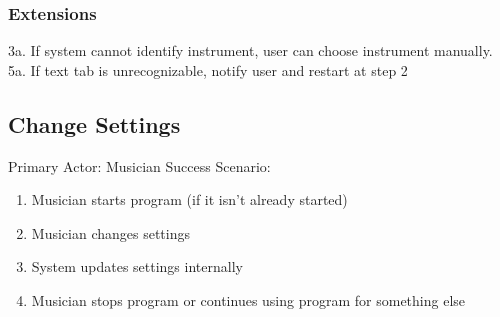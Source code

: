 \documentclass[11pt]{article}
\begin{document}
\subsubsection{Extensions}
\label{sec:orga29f8ba}
3a. If system cannot identify instrument, user can choose instrument manually.
5a. If text tab is unrecognizable, notify user and restart at step 2

\subsection{Change Settings}
\label{sec:orga3d6cb7}
Primary Actor: Musician
Success Scenario:
\begin{enumerate}
\item Musician starts program (if it isn't already started)
\item Musician changes settings
\item System updates settings internally
\item Musician stops program or continues using program for something else
\end{enumerate}
\end{document}
